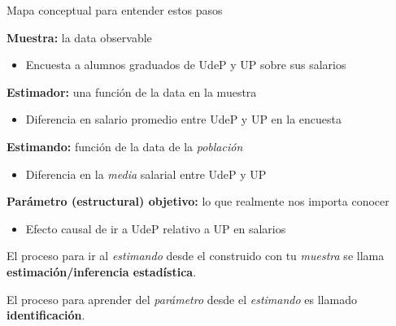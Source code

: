 \documentclass[11pt,handout,aspectratio=169]{beamer}
\newenvironment{wideitemize}{\itemize\addtolength{\itemsep}{10pt}}{\enditemize}
\begin{document}
\begin{frame}{Mapa conceptual para entender estos pasos}
	
\begin{wideitemize}

\item \textbf{Muestra:} la data observable
	\begin{itemize}
		\item
		Encuesta a alumnos graduados de UdeP y UP sobre sus salarios
	\end{itemize}

\pause
\item \textbf{Estimador:} una función de la data en la muestra
	\begin{itemize}
		\item Diferencia en salario promedio entre UdeP y UP en la encuesta
	\end{itemize}

\pause
\item \textbf{Estimando:} función de la data de la \textit{población}
	\begin{itemize}
		\item Diferencia en la \textit{media} salarial entre UdeP y UP
	\end{itemize}

\pause 
\item \textbf{Parámetro (estructural) objetivo:} lo que realmente nos importa conocer
	\begin{itemize}
		\item Efecto causal de ir a UdeP relativo a UP en salarios
	\end{itemize}

\end{wideitemize}	

\medskip
\pause
\begin{wideitemize}

\item El proceso para ir al \textit{estimando} desde el  construido con tu \textit{muestra} se llama \textbf{estimación/inferencia estadística}.

\pause 
\item El proceso para aprender del \textit{parámetro} desde el \textit{estimando} es llamado \textbf{identificación}.

\end{wideitemize}
	
\end{frame}
\end{document}
